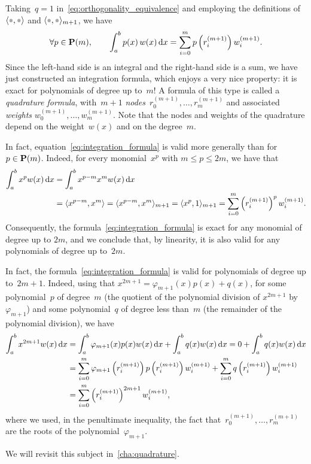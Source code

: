 Taking~$q = 1$ in~\eqref{eq:orthogonality_equivalence} and employing the definitions of~$\ip{\placeholder, \placeholder}$ and $\ip{\placeholder, \placeholder}_{m+1}$,
we have
\begin{equation}
    \label{eq:integration_formula}
    \forall p \in \mathbf P(m),
    \qquad \int_{a}^{b} p(x) \, w(x) \, \mathrm d x
    = \sum_{i=0}^{m} p\left(r_i^{(m+1)}\right) w^{(m+1)}_i.
\end{equation}
Since the left-hand side is an integral and the right-hand side is a sum,
we have just constructed an integration formula,
which enjoys a very nice property: it is exact for polynomials of degree up to~$m$!
A formula of this type is called a \emph{quadrature formula},
with~$m+1$ \emph{nodes}~$r^{(m+1)}_0, \dotsc, r^{(m+1)}_m$ and associated \emph{weights} $w^{(m+1)}_0, \dotsc, w^{(m+1)}_m$.
Note that the nodes and weights of the quadrature depend on the weight~$w(x)$ and on the degree~$m$.

In fact, equation~\eqref{eq:integration_formula} is valid more generally than for~$p \in \mathbf P(m)$.
Indeed, for every monomial~$x^p$ with $m \leq p \leq 2m$,
we have that
\begin{align*}
    \int_{a}^{b} x^p w(x) \, \mathrm d x
    &= \int_{a}^{b} x^{p-m} x^m  w(x) \, \mathrm d x \\
    &= \langle x^{p-m},x^m\rangle = \langle x^{p-m},x^m\rangle_{m+1}
    = \langle x^{p},1\rangle_{m+1} = \sum_{i=0}^{m} \left(r_i^{(m+1)}\right)^{p} w^{(m+1)}_i.
\end{align*}
Consequently, the formula~\eqref{eq:integration_formula} is exact for any monomial of degree up to $2m$,
and we conclude that, by linearity, it is also valid for any polynomials of degree up to~$2m$.

\begin{remark}
    In fact, the formula~\eqref{eq:integration_formula} is valid for polynomials of degree up to~$2m+1$.
    Indeed, using that $x^{2m+1} = \varphi_{m+1}(x) p(x) + q(x)$,
    for some polynomial~$p$ of degree~$m$ (the quotient of the polynomial division of $x^{2m+1}$ by $\varphi_{m+1}$) and some polynomial~$q$ of degree less than~$m$ (the remainder of the polynomial division),
    we have
    \begin{align*}
        \int_{a}^{b} x^{2m+1} w(x) \, \mathrm d x
        &= \int_{a}^{b} \varphi_{m+1}(x) p(x) w(x) \, \mathrm d x + \int_{a}^{b} q(x) w(x) \, \mathrm d x = 0 + \int_{a}^{b} q(x) w(x) \, \mathrm d x \\
        &= \sum_{i=0}^{m} \varphi_{m+1}\left(r_i^{(m+1)}\right) p\left(r_i^{(m+1)}\right)  w^{(m+1)}_i + \sum_{i=0}^{m} q\left(r_i^{(m+1)}\right) w^{(m+1)}_i \\
        &= \sum_{i=0}^{m} \left(r_i^{(m+1)}\right)^{2m+1} w^{(m+1)}_i,
    \end{align*}
    where we used, in the penultimate inequality,
    the fact that~$r_0^{(m+1)}, \dotsc, r_m^{(m+1)}$ are the roots of the polynomial~$\varphi_{m+1}$.
\end{remark}
We will revisit this subject in~\cref{cha:quadrature}.

